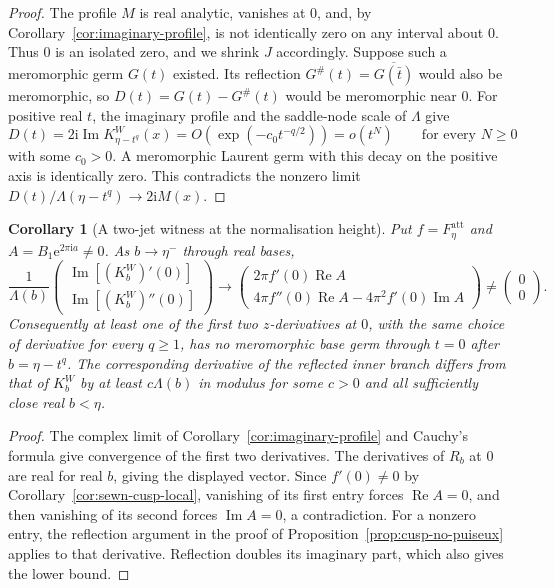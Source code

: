 \documentclass[11pt]{amsart}
\newtheorem{corollary}[theorem]{Corollary}
\theoremstyle{definition}
\newcommand{\Rr}{R}
\newcommand{\Kk}{K}
\newcommand{\eee}{\mathrm{e}}
\newcommand{\ii}{\mathrm{i}}
\begin{document}
\begin{proof}
The profile $M$ is real analytic, vanishes at $0$, and, by
Corollary~\ref{cor:imaginary-profile}, is not identically zero on any
interval about $0$.  Thus $0$ is an isolated zero, and we shrink $J$
accordingly.
Suppose such a meromorphic germ $G(t)$ existed.  Its reflection
$G^\#(t)=\overline{G(\bar t)}$ would also be meromorphic, so
$D(t)=G(t)-G^\#(t)$ would be meromorphic near $0$.
For positive real $t$, the imaginary profile and the saddle-node
scale of $\Lambda$ give
\[
 D(t)=2\ii\operatorname{Im}\Kk^W_{\eta-t^q}(x)
 =O\!\left(\exp(-c_0t^{-q/2})\right)=o(t^N)
 \qquad\text{for every }N\ge0
\]
with some $c_0>0$.  A meromorphic Laurent germ with this decay on the
positive axis is identically zero.  This contradicts the nonzero
limit $D(t)/\Lambda(\eta-t^q)\to2\ii M(x)$.
\end{proof}

\begin{corollary}[A two-jet witness at the normalisation height]
\label{cor:cusp-two-jet}
Put $f=F_\eta^{\mathrm{att}}$ and $A=B_1\eee^{2\pi\ii a}\ne0$.
As $b\to\eta^-$ through real bases,
\[
 \frac{1}{\Lambda(b)}
 \begin{pmatrix}
   \operatorname{Im}[(\Kk_b^W)'(0)]\\
   \operatorname{Im}[(\Kk_b^W)''(0)]
 \end{pmatrix}
 \longrightarrow
 \begin{pmatrix}
   2\pi f'(0)\operatorname{Re}A\\
   4\pi f''(0)\operatorname{Re}A
     -4\pi^2 f'(0)\operatorname{Im}A
 \end{pmatrix}\ne\begin{pmatrix}0\\0\end{pmatrix}.
\]
Consequently at least one of the first two $z$-derivatives at $0$,
with the same choice of derivative for every $q\ge1$, has no
meromorphic base germ through $t=0$ after $b=\eta-t^q$.
The corresponding derivative of the reflected inner branch differs
from that of $\Kk_b^W$ by at least $c\Lambda(b)$ in modulus for some
$c>0$ and all sufficiently close real $b<\eta$.
\end{corollary}

\begin{proof}
The complex limit of Corollary~\ref{cor:imaginary-profile} and
Cauchy's formula give convergence of the first two derivatives.
The derivatives of $\Rr_b$ at $0$ are real for real $b$, giving the
displayed vector.  Since $f'(0)\ne0$ by
Corollary~\ref{cor:sewn-cusp-local}, vanishing of its first entry
forces $\operatorname{Re}A=0$, and then vanishing of its second forces
$\operatorname{Im}A=0$, a contradiction.
For a nonzero entry, the reflection argument in the proof of
Proposition~\ref{prop:cusp-no-puiseux} applies to that derivative.
Reflection doubles its imaginary part, which also gives the lower bound.
\end{proof}
\end{document}
